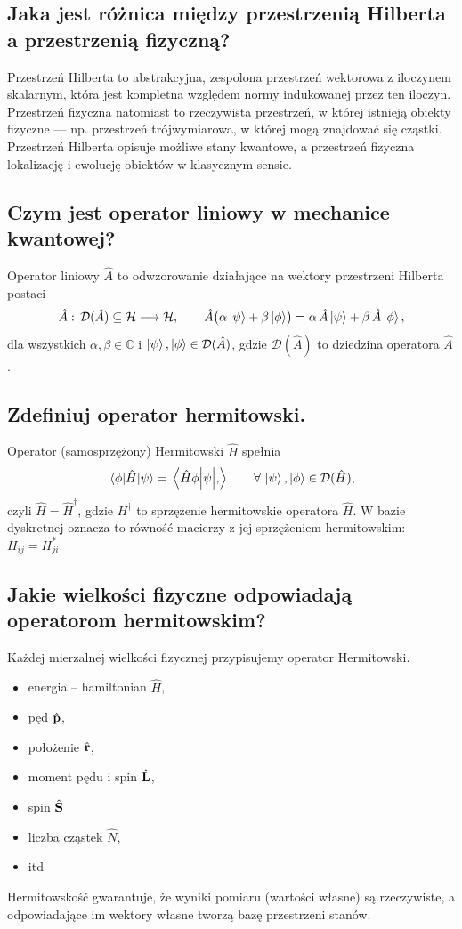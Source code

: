 \subsection{Jaka jest różnica między przestrzenią Hilberta a przestrzenią fizyczną?}

Przestrzeń Hilberta to abstrakcyjna, zespolona przestrzeń wektorowa z iloczynem skalarnym, która jest kompletna względem normy indukowanej przez ten iloczyn. Przestrzeń fizyczna natomiast to rzeczywista przestrzeń, w której istnieją obiekty fizyczne — np. przestrzeń trójwymiarowa, w której mogą znajdować się cząstki. Przestrzeń Hilberta opisuje możliwe stany kwantowe, a przestrzeń fizyczna lokalizację i ewolucję obiektów w klasycznym sensie.

\subsection{Czym jest operator liniowy w mechanice kwantowej?}

Operator liniowy $\hat A$ to odwzorowanie działające na wektory przestrzeni Hilberta postaci
$$
\hat A:\,\mathcal{D}(\hat A)\subseteq\mathcal{H}\longrightarrow\mathcal{H},
\qquad
\hat A\bigl(\alpha \ket{\psi}+\beta\ket{\phi}\bigr)=
\alpha\,\hat A\ket{\psi}+\beta\,\hat A\ket{\phi},
$$
dla wszystkich $\alpha,\beta\in\mathbb{C}$ i $\ket{\psi},\ket{\phi}\in\mathcal{D}(\hat A)$, gdzie $\mathcal{D}(\hat A)$ to dziedzina operatora $\hat{A}$.

\subsection{Zdefiniuj operator hermitowski.}

Operator (samosprzężony) Hermitowski $\hat H$ spełnia
$$
\mel{\phi}{\hat H}{\psi}
=\mel{\hat H\phi}{\psi},
\qquad
\forall\,\ket{\psi},\ket{\phi}\in\mathcal{D}(\hat H),
$$
czyli $\hat H=\hat H^{\dagger}$, gdzie $H^{\dagger}$ to sprzężenie hermitowskie operatora $\hat{H}$.  W bazie dyskretnej oznacza to równość macierzy z jej sprzężeniem hermitowskim: $H_{ij}=H_{ji}^{*}$.

\subsection{Jakie wielkości fizyczne odpowiadają operatorom hermitowskim?}

Każdej mierzalnej wielkości fizycznej przypisujemy operator Hermitowski.
\begin{itemize}
  \item energia – hamiltonian $\hat H$,
  \item pęd $\hat{\vb{p}}$,
  \item położenie $\hat{\vb{r}}$,
  \item moment pędu i spin $\hat{\vb{L}}$,
  \item spin $\hat{\vb{S}}$
  \item liczba cząstek $\hat N$,
  \item itd
\end{itemize}
Hermitowskość gwarantuje, że wyniki pomiaru (wartości własne) są rzeczywiste, a odpowiadające im wektory własne tworzą bazę przestrzeni stanów.

